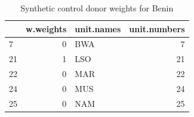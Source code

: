 \begin{table}

\caption{Synthetic control donor weights for Benin}
\centering
\begin{tabular}[t]{lrlr}
\toprule
  & w.weights & unit.names & unit.numbers\\
\midrule
7 & 0 & BWA & 7\\
21 & 1 & LSO & 21\\
22 & 0 & MAR & 22\\
24 & 0 & MUS & 24\\
25 & 0 & NAM & 25\\
\bottomrule
\end{tabular}
\end{table}